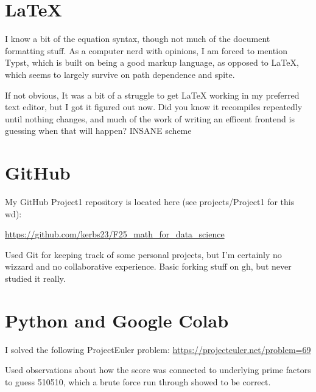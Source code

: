 \documentclass[letterpaper, 11pt]{amsart}
\begin{document}


\section{\LaTeX}

\medskip

 I know a bit of the equation syntax, though not much of the document formatting stuff. As a computer nerd with opinions, I am forced to mention Typst, which is built on being a good markup language, as opposed to \LaTeX, which seems to largely survive on path dependence and spite.

If not obvious, It was a bit of a struggle to get LaTeX working in my preferred text editor, but I got it figured out now. Did you know it recompiles repeatedly until nothing changes, and much of the work of writing an efficent frontend is guessing when that will happen? INSANE scheme
\section{GitHub}
My GitHub Project1 repository is located here (see projects/Project1 for this wd):
\begin{center}
\url{https://github.com/kerbs23/F25_math_for_data_science}
\end{center}



\medskip

 Used Git for keeping track of some personal projects, but I'm certainly no wizzard and no collaborative experience. Basic forking stuff on gh, but never studied it really.



\section{Python and Google Colab}
I solved the following ProjectEuler problem: \url{https://projecteuler.net/problem=69}

\medskip

\noindent Used observations about how the score was connected to underlying prime factors to guess 510510, which a brute force run through showed to be correct.
\end{document}
